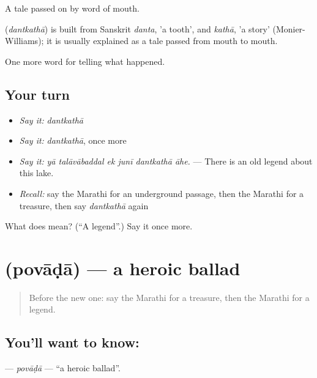 A tale passed on by word of mouth.

\begin{cousinweb}
\textbf{} (\emph{dantkathā}) is built from Sanskrit \emph{danta}, 'a tooth', and \emph{kathā}, 'a story' (Monier-Williams); it is usually explained as a tale passed from mouth to mouth.
\end{cousinweb}

\begin{grammarlens}[title={What you've built}]
One more word for telling what happened.
\end{grammarlens}

\subsection*{Your turn}
\begin{itemize}
\raggedright
  \item \emph{Say it:} \emph{dantkathā}
  \item \emph{Say it:} \emph{dantkathā}, once more
  \item \emph{Say it:} \emph{yā talāvābaddal ek junī dantkathā āhe.} — There is an old legend about this lake.
  \item \emph{Recall:} say the Marathi for an underground passage, then the Marathi for a treasure, then say \emph{dantkathā} again
\end{itemize}

\begin{tcolorbox}[breakable,colback=teal!4,colframe=teal!35!black,title={Before you move on}]
What does  mean? (\textquotedblleft{}A legend\textquotedblright{}.) Say it once more.
\end{tcolorbox}
\section[\texorpdfstring{\mr{पोवाडा} (povāḍā)}{पोवाडा (povāḍā)}]{ (povāḍā) — a heroic ballad}

\label{lesson:MR-C337-povada}



\begin{quote}
Before the new one: say the Marathi for a treasure, then the Marathi for a legend.
\end{quote}

\subsection*{You'll want to know: }
\textbf{} — \emph{povāḍā} — \textquotedblleft{}a heroic ballad\textquotedblright{}.

